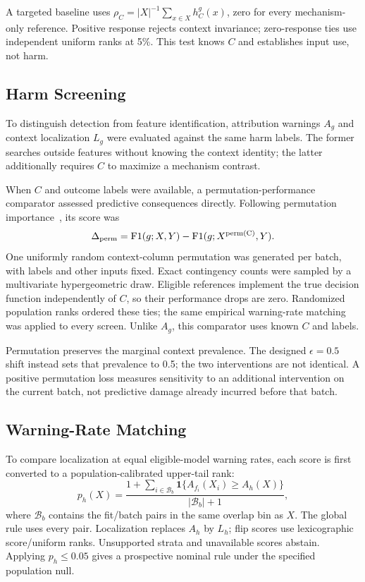 \documentclass[conference]{IEEEtran}
\begin{document}
A targeted baseline uses $\rho_C=|X|^{-1}\sum_{x\in X}h_C^g(x)$, zero for every mechanism-only reference. Positive response rejects context invariance; zero-response ties use independent uniform ranks at 5\%. This test knows $C$ and establishes input use, not harm.

\subsection{Harm Screening}
To distinguish detection from feature identification, attribution warnings $A_g$ and context localization $L_g$ were evaluated against the same harm labels. The former searches outside features without knowing the context identity; the latter additionally requires $C$ to maximize a mechanism contrast.

When $C$ and outcome labels were available, a permutation-performance comparator assessed predictive consequences directly. Following permutation importance~\cite{breiman2001forests,altmann2010permutation}, its score was
\begin{equation}
 \Delta_{\rm perm}=\operatorname{F1}(g;X,Y)-\operatorname{F1}(g;X^{\rm perm(C)},Y).
\end{equation}
One uniformly random context-column permutation was generated per batch, with labels and other inputs fixed. Exact contingency counts were sampled by a multivariate hypergeometric draw. Eligible references implement the true decision function independently of $C$, so their performance drops are zero. Randomized population ranks ordered these ties; the same empirical warning-rate matching was applied to every screen. Unlike $A_g$, this comparator uses known $C$ and labels.

Permutation preserves the marginal context prevalence. The designed $\epsilon=0.5$ shift instead sets that prevalence to 0.5; the two interventions are not identical. A positive permutation loss measures sensitivity to an additional intervention on the current batch, not predictive damage already incurred before that batch.

\subsection{Warning-Rate Matching}
To compare localization at equal eligible-model warning rates, each score is first converted to a population-calibrated upper-tail rank:
\begin{equation}
 p_h(X)=\frac{1+\sum_{i\in\mathcal B_b}\mathbf1\{A_{f_i}(X_i)\geq A_h(X)\}}{|\mathcal B_b|+1},
\end{equation}
where $\mathcal B_b$ contains the fit/batch pairs in the same overlap bin as $X$. The global rule uses every pair. Localization replaces $A_h$ by $L_h$; flip scores use lexicographic score/uniform ranks. Unsupported strata and unavailable scores abstain. Applying $p_h\leq0.05$ gives a prospective nominal rule under the specified population null.
\end{document}
